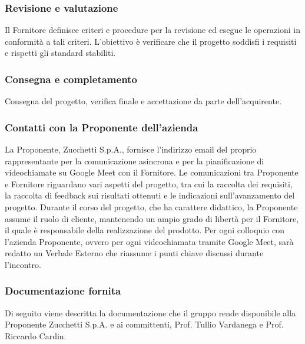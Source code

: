 \subsubsection{Revisione e valutazione}
Il Fornitore definisce criteri e procedure per la revisione ed esegue le operazioni in conformità a tali criteri. L'obiettivo è verificare che il progetto soddisfi i requisiti e rispetti gli standard stabiliti.

\subsubsection{Consegna e completamento}
Consegna del progetto, verifica finale e accettazione da parte dell’acquirente.

\subsubsection{Contatti con la Proponente dell’azienda}
La Proponente, Zucchetti S.p.A., fornisce l'indirizzo email del proprio rappresentante per la comunicazione asincrona e per la pianificazione di videochiamate su Google Meet con il Fornitore. Le comunicazioni tra Proponente e Fornitore riguardano vari aspetti del progetto, tra cui la raccolta dei requisiti, la raccolta di feedback sui risultati ottenuti e le indicazioni sull'avanzamento del progetto. Durante il corso del progetto, che ha carattere didattico, la Proponente assume il ruolo di cliente, mantenendo un ampio grado di libertà per il Fornitore, il quale è responsabile della realizzazione del prodotto. Per ogni colloquio con l'azienda Proponente, ovvero per ogni videochiamata tramite Google Meet, sarà redatto un Verbale Esterno che riassume i punti chiave discussi durante l'incontro.

\subsubsection{Documentazione fornita}
Di seguito viene descritta la documentazione che il gruppo rende disponibile alla Proponente Zucchetti S.p.A. e ai committenti, Prof. Tullio Vardanega e Prof. Riccardo Cardin.

